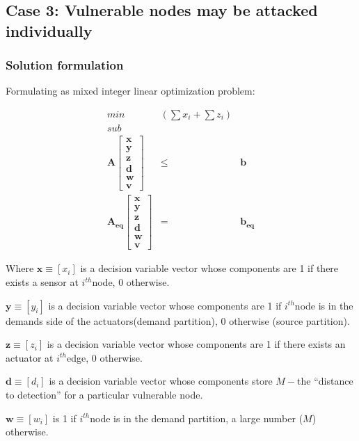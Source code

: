 \documentclass[authoryear,preprint,review,12pt]{elsarticle}
\begin{document}
\subsection{\label{sub:Case-3:-Vulnerable}Case 3: Vulnerable nodes may be attacked
individually}


\subsubsection{Solution formulation}

Formulating as mixed integer linear optimization problem:

\begin{eqnarray*}
min & (\sum x_{i}+\sum z_{i})\\
sub\\
\mathbf{A}\left[\begin{array}{c}
\mathbf{x}\\
\mathbf{y}\\
\mathbf{z}\\
\mathbf{d}\\
\mathbf{w}\\
\mathbf{v}
\end{array}\right] & \leq & \mathbf{b}\\
\mathbf{A_{eq}}\left[\begin{array}{c}
\mathbf{x}\\
\mathbf{y}\\
\mathbf{z}\\
\mathbf{d}\\
\mathbf{w}\\
\mathbf{v}
\end{array}\right] & = & \mathbf{b_{eq}}
\end{eqnarray*}


Where $\mathbf{x}\equiv[x_{i}]$ is a decision variable vector whose
components are 1 if there exists a sensor at $i^{th}$node, 0 otherwise.

$\mathbf{y}\equiv[y_{i}]$ is a decision variable vector whose components
are 1 if $i^{th}$node is in the demands side of the actuators(demand
partition), 0 otherwise (source partition).

$\mathbf{z}\equiv[z_{i}]$ is a decision variable vector whose components
are 1 if there exists an actuator at $i^{th}$edge, 0 otherwise.

$\mathbf{d}\equiv[d_{i}]$ is a decision variable vector whose components
store $M-$the ``distance to detection'' for a particular vulnerable
node.

$\mathbf{w}\equiv[w_{i}]$ is 1 if $i^{th}$node is in the demand
partition, a large number ($M$) otherwise.
\end{document}
